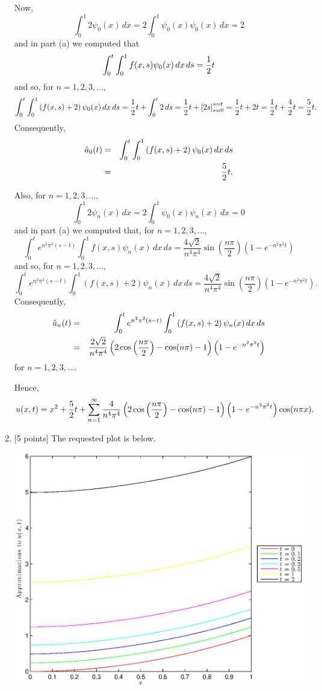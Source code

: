 \begin{solution}
\begin{enumerate}
Now,
\[
\int_0^1 2\psi_0(x)\,dx= 2\int_0^1\psi_0(x)\psi_0(x)\,dx=2
\]
and in part (a) we computed that
\[
\int_0^t\int_0^1f(x,s)\psi_0(x)\,dx\,ds={1 \over 2}t
\]
and so, for $n=1,2,3,\ldots$,
\[
\int_0^t\int_0^1\left(f(x,s)+2\right)\psi_0(x)\,dx\,ds={1 \over 2}t+\int_0^t2\,ds={1 \over 2}t+\left[2s\right]_{s=0}^{s=t}={1 \over 2}t+2t={1 \over 2}t+{4 \over 2}t={5 \over 2}t.
\]
Consequently,
\begin{eqnarray*}
\hat{a}_0(t)&=&\int_0^t\int_0^1\left(f(x,s)+2\right)\psi_0(x)\,dx\,ds
\\
&=&{5 \over 2}t.
\end{eqnarray*}

Also, for $n=1,2,3,\ldots$,
\[
\int_0^1 2\psi_n(x)\,dx= 2\int_0^1\psi_0(x)\psi_n(x)\,dx=0
\]
and in part (a) we computed that, for $n=1,2,3,\ldots$,
\[
\int_0^te^{n^2\pi^2\left(s-t\right)}\int_0^1f(x,s)\psi_n(x)\,dx\,ds=\frac{4\sqrt{2}}{n^4\pi^4}\sin\left(\frac{n\pi}{2}\right)\left(1-e^{-n^2\pi^2t}\right)
\]
and so, for $n=1,2,3,\ldots$,
\[
\int_0^te^{n^2\pi^2\left(s-t\right)}\int_0^1\left(f(x,s)+2\right)\psi_n(x)\,dx\,ds=\frac{4\sqrt{2}}{n^4\pi^4}\sin\left(\frac{n\pi}{2}\right)\left(1-e^{-n^2\pi^2t}\right).
\]
Consequently,
\begin{eqnarray*}
\hat{a}_n(t)&=&\int_0^te^{n^2\pi^2\left(s-t\right)}\int_0^1\left(f(x,s)+2\right)\psi_n(x)\,dx\,ds
\\
&=&{2\sqrt{2} \over n^4\pi^4}\left(2\cos\left({n\pi \over 2}\right)-\cos(n\pi)-1\right)\left(1-e^{-n^2\pi^2t}\right)
\end{eqnarray*}
for $n=1,2,3,\ldots$.


Hence,
\[
u(x,t)=x^2+{5 \over 2}t+\sum_{n=1}^\infty {4 \over n^4\pi^4}\left(2\cos\left({n\pi \over 2}\right)-\cos(n\pi)-1\right)\left(1-e^{-n^2\pi^2t}\right)\cos(n\pi x).
\]

\item {[5 points]} The requested plot is below.

\begin{center}\includegraphics[scale=0.7]{hw39d.eps}\end{center}


\end{enumerate}
\end{solution}
